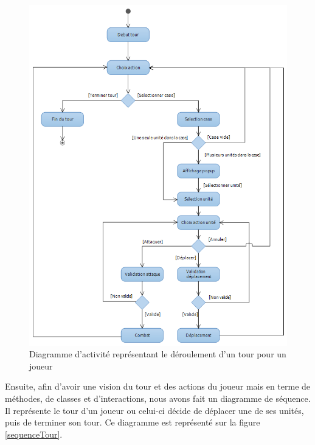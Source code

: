 \begin{figure}[!h] 
\centerline{\includegraphics[width=\textwidth]{img/activite_tour_ex.png}}
   \caption{\label{étiquette} Diagramme d'activité représentant le déroulement d'un tour pour un joueur}
\label{activiteTour}
\end{figure}

Ensuite, afin d'avoir une vision du tour et des actions du joueur mais en terme de méthodes, de classes et d'interactions, nous avons fait un diagramme de séquence. Il représente le tour d'un joueur ou celui-ci décide de déplacer une de ses unités, puis de terminer son tour. Ce diagramme est représenté sur la figure \ref{sequenceTour}.\\

